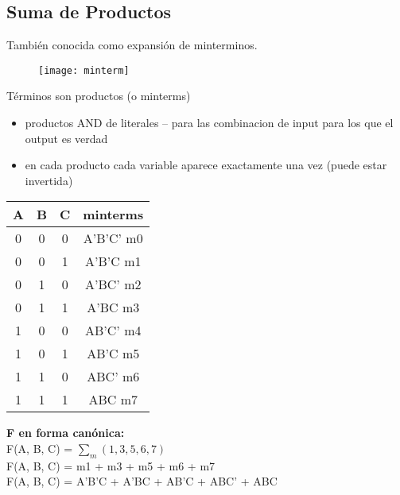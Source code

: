 \documentclass{article}
\begin{document}
            \subsection{Suma de Productos}
                También conocida como expansión de minterminos.\\
                \begin{figure}[htp]
                \centering
                \texttt{[image: minterm]}
                \end{figure}
                \newline Términos son productos (o minterms)
                \begin{itemize}
                \item productos AND de literales – para las combinacion de input para los que el output es verdad
                \item en cada producto cada variable aparece exactamente una vez (puede estar invertida)
                \end{itemize}
                \begin{center}
                \renewcommand{\arraystretch}{1.5}
                \begin{tabular}{ c c c|c } 
                A & B & C & minterms \\ 
                \hline
                 0 & 0 & 0 & A'B'C' m0\\ 
                 0 & 0 & 1 & A’B’C  m1\\ 
                 0 & 1 & 0 & A’BC’  m2\\ 
                 0 & 1 & 1 & A’BC   m3\\ 
                 1 & 0 & 0 & AB’C’  m4\\ 
                 1 & 0 & 1 & AB’C   m5\\ 
                 1 & 1 & 0 & ABC’   m6\\ 
                 1 & 1 & 1 & ABC    m7\\ 
                 \end{tabular}
                \end{center}
                \newline \textbf{F en forma canónica:}\\
                \newline
                F(A, B, C) = $\sum_m(1,3,5,6,7)$\\
                F(A, B, C)  = m1 + m3 + m5 + m6 + m7\\
                F(A, B, C)  = A’B’C + A’BC + AB’C + ABC’ + ABC\\
\end{document}
